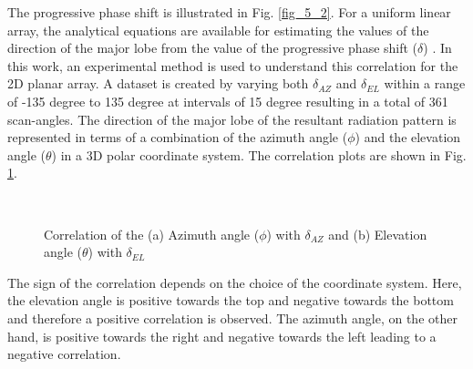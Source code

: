 The progressive phase shift is illustrated in Fig. \ref{fig_5_2}. For a uniform linear array, the analytical equations are available for estimating the values of the direction of the major lobe from the value of the progressive phase shift ($\delta$) \cite{phasedArrayHandbook}. In this work, an experimental method is used to understand this correlation for the 2D planar array. A dataset is created by varying both $\delta_{AZ}$ and $\delta_{EL}$ within a range of -135 degree to 135 degree at intervals of 15 degree resulting in a total of 361 scan-angles. The direction of the major lobe of the resultant radiation pattern is represented in terms of a combination of the azimuth angle ($\phi$) and the elevation angle ($\theta$) in a 3D polar coordinate system. The correlation plots are shown in Fig. \ref{fig_5_3}.

\begin{figure}
  \centering
   ~~~
  \\
  \caption{Correlation of the (a) Azimuth angle ($\phi$) with $\delta_{AZ}$ and (b) Elevation angle ($\theta$) with $\delta_{EL}$} \label{fig_5_3}
\end{figure}

The sign of the correlation depends on the choice of the coordinate system. Here, the elevation angle is positive towards the top and negative towards the bottom and therefore a positive correlation is observed. The azimuth angle, on the other hand, is positive towards the right and negative towards the left leading to a negative correlation.

